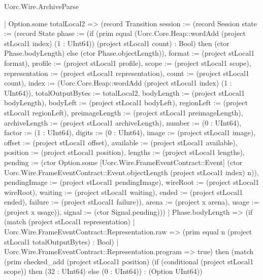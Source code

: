 \begin{lexlean}{Uorc.Wire.ArchiveParse}
\begin{semanticmodule}
{      | Option.some totalLocal2 => (record Transition {session := (record Session {state := (record State {phase := (if (prim equal (Uorc.Core.Heap::wordAdd (project stLocal1 index) (1 : UInt64)) (project stLocal1 count) : Bool) then (ctor Phase.bodyLength) else (ctor Phase.objectLength)), format := (project stLocal1 format), profile := (project stLocal1 profile), scope := (project stLocal1 scope), representation := (project stLocal1 representation), count := (project stLocal1 count), index := (Uorc.Core.Heap::wordAdd (project stLocal1 index) (1 : UInt64)), totalOutputBytes := totalLocal2, bodyLength := (project stLocal1 bodyLength), bodyLeft := (project stLocal1 bodyLeft), regionLeft := (project stLocal1 regionLeft), preimageLength := (project stLocal1 preimageLength), archiveLength := (project stLocal1 archiveLength), number := (0 : UInt64), factor := (1 : UInt64), digits := (0 : UInt64), image := (project stLocal1 image), offset := (project stLocal1 offset), available := (project stLocal1 available), position := (project stLocal1 position), lengths := (project stLocal1 lengths), pending := (ctor Option.some [Uorc.Wire.FrameEventContract::Event] (ctor Uorc.Wire.FrameEventContract::Event.objectLength (project stLocal1 index) n)), pendingImage := (project stLocal1 pendingImage), wireRoot := (project stLocal1 wireRoot), waiting := (project stLocal1 waiting), ended := (project stLocal1 ended), failure := (project stLocal1 failure)}), arena := (project x arena), usage := (project x usage)}), signal := (ctor Signal.pending)}))
    | Phase.bodyLength => (if (match (project stLocal1 representation)
      | Uorc.Wire.FrameEventContract::Representation.raw => (prim equal n (project stLocal1 totalOutputBytes) : Bool)
      | Uorc.Wire.FrameEventContract::Representation.program => true) then (match (prim checked_add (project stLocal1 position) (if (conditional (project stLocal1 scope)) then (32 : UInt64) else (0 : UInt64)) : (Option UInt64))
}
\end{semanticmodule}
\end{lexlean}
